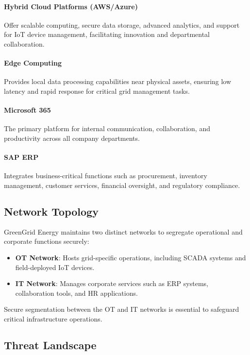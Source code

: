 \paragraph{Hybrid Cloud Platforms (AWS/Azure)}
Offer scalable computing, secure data storage, advanced analytics, and support for \ac{IoT} device management, facilitating innovation and departmental collaboration.

\paragraph{Edge Computing}
Provides local data processing capabilities near physical assets, ensuring low latency and rapid response for critical grid management tasks.

\paragraph{Microsoft 365}
The primary platform for internal communication, collaboration, and productivity across all company departments.

\paragraph{\ac{SAP} \ac{ERP}}
Integrates business-critical functions such as procurement, inventory management, customer services, financial oversight, and regulatory compliance.

\subsection{Network Topology}

GreenGrid Energy maintains two distinct networks to segregate operational and corporate functions securely:

\begin{itemize}
    \item \textbf{\ac{OT} Network}: Hosts grid-specific operations, including \ac{SCADA} systems and field-deployed \ac{IoT} devices.
    \item \textbf{\ac{IT} Network}: Manages corporate services such as \ac{ERP} systems, collaboration tools, and \ac{HR} applications.
\end{itemize}

Secure segmentation between the \ac{OT} and \ac{IT} networks is essential to safeguard critical infrastructure operations.

\subsection{Threat Landscape}


